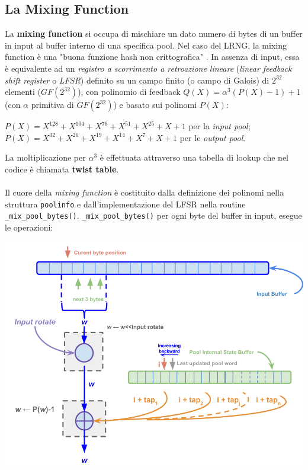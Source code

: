 \documentclass{article}
\begin{document}
 
 \subsection{La Mixing Function}\label{mixingfunction}
 La \textbf{mixing function} si occupa di mischiare un dato numero di bytes di
 un buffer in input al buffer interno di una specifica pool. Nel caso del LRNG,
 la mixing function è una "buona funzione hash non crittografica" \cite{lach}.
 In assenza di input, essa è equivalente ad un \emph{registro a scorrimento a
 retroazione lineare} (\emph{linear feedback shift register} o \emph{LFSR})
 definito su un campo finito (o campo di Galois) di $2^{32}$ elementi
 ($GF(2^{32})$), con polinomio di feedback $Q(X)=\alpha^3(P(X)-1)+1$ (con
 $\alpha$ primitiva di $GF(2^{32})$) e basato sui polinomi $P(X)$:
 \begin{center}
 $P(X)=X^{128}+X^{104}+X^{76}+X^{51}+X^{25}+X+1$ per la \emph{input pool};
 $P(X)=X^{32}+X^{26}+X^{19}+X^{14}+X^{7}+X+1$ per le \emph{output pool}.
 \end{center}
 La moltiplicazione per $\alpha^3$ è effettuata attraverso una tabella di lookup
 che nel codice è chiamata \textbf{twist table}.
 
 \paragraph{} Il cuore della \emph{mixing function} è costituito dalla
 definizione dei polinomi nella struttura \verb+poolinfo+ e dall'implementazione
 del LFSR nella routine \verb+_mix_pool_bytes()+. 
 \newline \verb+_mix_pool_bytes()+ per ogni byte del buffer in input, esegue le
 operazioni:\\
        \centerline{\includegraphics[width=150mm]{img/mixing_function1.png}} 
 
\end{document}
